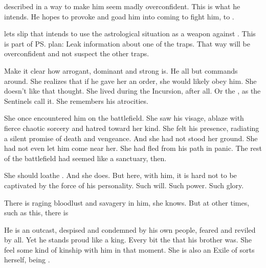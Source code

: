 \begin{garbage}
\Achsah{} described \Teshrial{} in a way to make him seem madly overconfident. 
This is what he intends. 
He hopes to provoke \Ishnaruchaefir{} and goad him into coming to fight him, to . 

\Achsah{} lets slip that \Teshrial{} intends to use the astrological situation as a weapon against \Ishnaruchaefir. 
This is part of \ps{\Teshrial} plan: 
Leak information about one of the traps. 
That way \Ishnaruchaefir{} will be overconfident and not suspect the other traps. 

Make it clear how arrogant, dominant and strong \QuessanthIshnaruchaefir{} is. 
He all but commands \Achsah{} around. 
She realizes that if he gave her an order, she would likely obey him. 
She doesn't like that thought. 
She lived during the Incursion, after all. 
Or the \secondbanewar, as the Sentinels call it. 
She remembers his atrocities. 

She once encountered him on the battlefield. 
She saw his visage, ablaze with fierce chaotic sorcery and hatred toward her kind. 
She felt his presence, radiating a silent promise of death and vengeance. 
And she had not stood her ground. 
She had not even let him come near her. 
She had fled from his path in panic. 
The rest of the battlefield had seemed like a sanctuary, then. 

\begin{prose}
\end{prose}



She should loathe \Ishnaruchaefir. 
And she does. 
But here, with him, it is hard not to be captivated by the force of his personality. 
Such will. 
Such power. 
Such glory. 

There is raging bloodlust and savagery in him, she knows. 
But at other times, such as this, there is 

He is an outcast, despised and condemned by his own people, feared and reviled by all. 
Yet he stands proud like a king. 
Every bit the \dragonking{} that his brother \Nexagglachel{} was. 
She feel some kind of kinship with him in that moment. 
She is also an Exile of sorts herself, being \ashenblooded. 

\begin{prose}
\end{prose}








\end{garbage}
